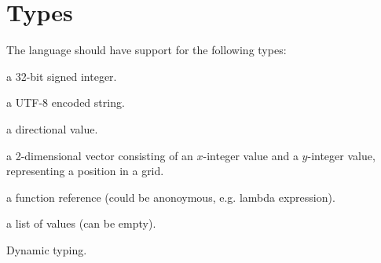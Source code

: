 \section{Types}

The language should have support for the following types:

\begin{description}[noitemsep]
\item[Integer] a 32-bit signed integer.
\item[String] a UTF-8 encoded string.
\item[Direction] a directional value.
\item[Coordinate] a 2-dimensional vector consisting of an $x$-integer value and
a $y$-integer value, representing a position in a grid.
\item[Function] a function reference (could be anonoymous, e.g. lambda expression).
\item[List] a list of values (can be empty).
\item[Action]
\end{description}

Dynamic typing.


